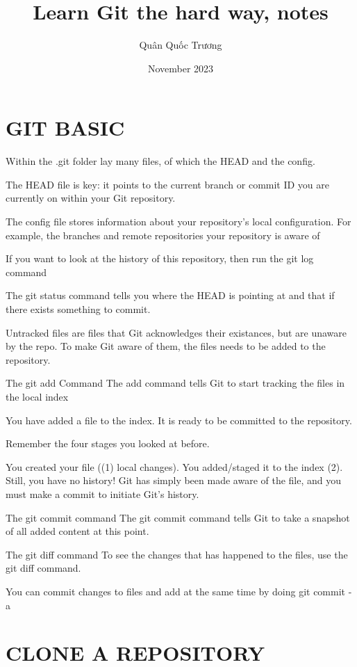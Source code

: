 \documentclass{report}
\title{Learn Git the hard way, notes}
\author{Quân Quốc Trương}
\date{November 2023}
\begin{document}
\maketitle

\newpage
\tableofcontents
\newpage

\chapter{GIT BASIC}

Within the .git folder lay many files, of which the HEAD and the config.

The HEAD file is key: it points to the current branch or commit ID you are currently on within your Git repository.

The config file stores information about your repository's local configuration. For example, the branches and remote repositories your repository is aware of

If you want to look at the history of this repository, then run the git log command

The git status command tells you where the HEAD is pointing at and that if there exists something to commit.

Untracked files are files that Git acknowledges their existances, but are unaware by the repo. To make Git aware of them, the files needs to be added to the repository.

The git add Command
The add command tells Git to start tracking the files in the local index

You have added a file to the index. It is ready to be committed to the repository.

Remember the four stages you looked at before.

You created your file ((1) local changes).
You added/staged it to the index (2).
Still, you have no history! Git has simply been made aware of the file, and you must make a commit to initiate Git's history.

The git commit command
The git commit command tells Git to take a snapshot of all added content at this point.

The git diff command
To see the changes that has happened to the files, use the git diff command.

You can commit changes to files and add at the same time by doing git commit -a

\chapter{CLONE A REPOSITORY}
\end{document}
